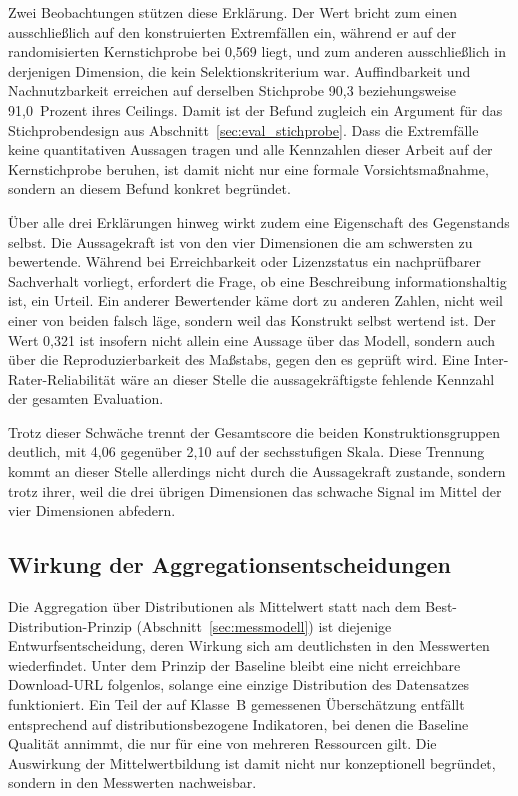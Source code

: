 Zwei Beobachtungen stützen diese Erklärung. Der Wert bricht zum einen
ausschließlich auf den konstruierten Extremfällen ein, während er auf der
randomisierten Kernstichprobe bei 0{,}569 liegt, und zum anderen ausschließlich in
derjenigen Dimension, die kein Selektionskriterium war. Auffindbarkeit und
Nachnutzbarkeit erreichen auf derselben Stichprobe 90{,}3 beziehungsweise
91{,}0~Prozent ihres Ceilings. Damit ist der Befund zugleich ein Argument für das
Stichprobendesign aus Abschnitt~\ref{sec:eval_stichprobe}. Dass die Extremfälle keine quantitativen Aussagen tragen und alle Kennzahlen
dieser Arbeit auf der Kernstichprobe beruhen, ist damit nicht nur eine formale
Vorsichtsmaßnahme, sondern an diesem Befund konkret begründet.

Über alle drei Erklärungen hinweg wirkt zudem eine Eigenschaft des Gegenstands
selbst. Die Aussagekraft ist von den vier Dimensionen die am schwersten zu
bewertende. Während bei Erreichbarkeit oder Lizenzstatus ein nachprüfbarer
Sachverhalt vorliegt, erfordert die Frage, ob eine Beschreibung informationshaltig
ist, ein Urteil. Ein
anderer Bewertender käme dort zu anderen Zahlen, nicht weil einer von beiden
falsch läge, sondern weil das Konstrukt selbst wertend ist. Der Wert 0{,}321 ist
insofern nicht allein eine Aussage über das Modell, sondern auch über die
Reproduzierbarkeit des Maßstabs, gegen den es geprüft wird. Eine
Inter-Rater-Reliabilität wäre an dieser Stelle die aussagekräftigste fehlende
Kennzahl der gesamten Evaluation.

Trotz dieser Schwäche trennt der Gesamtscore die beiden Konstruktionsgruppen
deutlich, mit 4{,}06 gegenüber 2{,}10 auf der sechsstufigen Skala. Diese Trennung kommt an dieser Stelle allerdings nicht durch die Aussagekraft
zustande, sondern trotz ihrer, weil die drei übrigen Dimensionen das schwache
Signal im Mittel der vier Dimensionen abfedern.

\subsection{Wirkung der Aggregationsentscheidungen}
\label{subsec:eval_aggregationswirkung}

Die Aggregation über Distributionen als Mittelwert statt nach dem
Best-Distribution-Prinzip (Abschnitt~\ref{sec:messmodell}) ist diejenige
Entwurfsentscheidung, deren Wirkung sich am deutlichsten in den Messwerten
wiederfindet. Unter dem Prinzip der Baseline bleibt eine nicht erreichbare
Download-URL folgenlos, solange eine einzige Distribution des Datensatzes
funktioniert. Ein Teil der auf Klasse~B gemessenen Überschätzung entfällt
entsprechend auf distributionsbezogene Indikatoren, bei denen die Baseline
Qualität annimmt, die nur für eine von mehreren Ressourcen gilt. Die Auswirkung der Mittelwertbildung ist damit nicht nur konzeptionell begründet,
sondern in den Messwerten nachweisbar.


